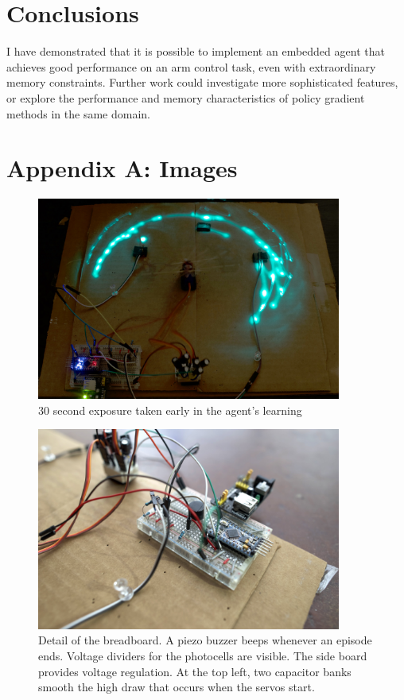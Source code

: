 \documentclass{article}
\begin{document}
	
	\section{Conclusions}

	I have demonstrated that it is possible to implement an embedded agent that achieves good performance on an arm control task, even with extraordinary memory constraints. Further work could investigate more sophisticated features, or explore the performance and memory characteristics of policy gradient methods in the same domain.
	
	\clearpage
	
	
	\section{Appendix A: Images}
	
		\begin{figure}[!htb]
			\centering
			\includegraphics[width=10cm]{../photos/long_shutter_small.jpg}
			\caption{30 second exposure taken early in the agent's learning}
			\label{fig:long_shutter}
		\end{figure}
		
		\begin{figure}[!htb]
			\centering
			\includegraphics[width=10cm]{../photos/breadboard_small.jpg}
			\caption{Detail of the breadboard. A piezo buzzer beeps whenever an episode ends. Voltage dividers for the photocells are visible. The side board provides voltage regulation. At the top left, two capacitor banks smooth the high draw that occurs when the servos start. }
			\label{fig:breadboard}
		\end{figure}
		
\end{document}
